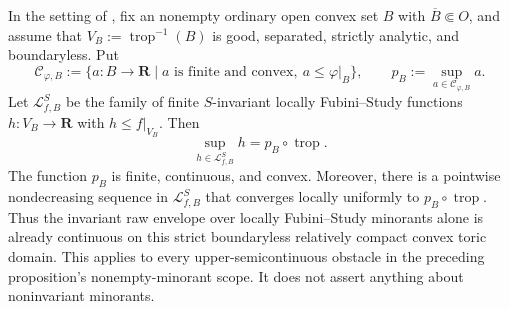 \begin{corollary}
\label{cor:p033-invariant-toric-lfs-minorant-envelope}
In the setting of , fix an
nonempty ordinary open convex set \(B\) with \(\overline B\Subset O\), and assume that
\(V_B:=\operatorname{trop}^{-1}(B)\) is good, separated, strictly analytic,
and boundaryless.  Put
\[
 \mathcal C_{\varphi,B}
 :=\{a:B\longrightarrow\mathbf R\mid
       a\text{ is finite and convex},\ a\leq\varphi|_B\},
 \qquad
 p_B:=\sup_{a\in\mathcal C_{\varphi,B}}a.
\]
Let \(\mathcal L^S_{f,B}\) be the family of finite \(S\)-invariant locally
Fubini--Study functions \(h:V_B\to\mathbf R\) with \(h\leq f|_{V_B}\).
Then
\[
              \sup_{h\in\mathcal L^S_{f,B}}h
              =p_B\circ\operatorname{trop}.
\]
The function \(p_B\) is finite, continuous, and convex.  Moreover, there is
a pointwise nondecreasing sequence in \(\mathcal L^S_{f,B}\) that converges
locally uniformly to \(p_B\circ\operatorname{trop}\).  Thus the invariant
raw envelope over locally Fubini--Study minorants alone is already continuous on this
strict boundaryless relatively compact convex toric domain.  This applies to every
upper-semicontinuous obstacle in the preceding proposition's nonempty-minorant
scope.  It does not assert anything about noninvariant minorants.
\end{corollary}
